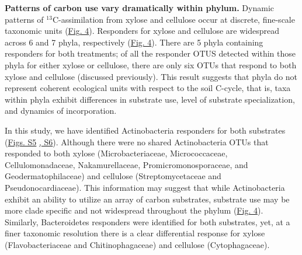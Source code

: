 \textbf{Patterns of carbon use vary dramatically within phylum.} Dynamic
patterns of $^{13}$C-assimilation from xylose and cellulose occur at discrete,
fine-scale taxonomic units
(\href{https://authorea.com/users/3537/articles/3612/master/file/figures/bacteria_tree/bacteria_tree.png}{Fig.
4}). Responders for xylose and cellulose are widespread across 6 and 7 phyla,
respectively
(\href{https://authorea.com/users/3537/articles/3612/master/file/figures/bacteria_tree/bacteria_tree.png}{Fig.
4}). There are 5 phyla containing responders for both treatments; of all the
responder OTUS detected within those phyla for either xylose or cellulose,
there are only six OTUs that respond to both xylose and cellulose (discussed
previously). This result suggests that phyla do not represent coherent
ecological units with respect to the soil C-cycle, that is, taxa within phyla
exhibit differences in substrate use, level of substrate specialization, and
dynamics of incorporation. 

In this study, we have identified Actinobacteria responders for both substrates
(\href{https://authorea.com/users/3537/articles/8459/master/file/figures/xylose_resp_profiles/xylose_resp_profiles.png}{Figs.
S5}
\href{https://authorea.com/users/3537/articles/8459/master/file/figures/cellulose_resp_profiles/cellulose_resp_profiles.png}{,
S6}). Although there were no shared Actinobacteria OTUs that responded to both
xylose (Microbacteriaceae, Micrococcaceae, Cellulomonadaceae, Nakamurellaceae,
Promicromonosporaceae, and Geodermatophilaceae) and cellulose
(Streptomycetaceae and Pseudonocardiaceae). This information may suggest that
while Actinobacteria exhibit an ability to utilize an array of carbon
substrates, substrate use may be more clade specific and not widespread
throughout the phylum
(\href{https://authorea.com/users/3537/articles/3612/master/file/figures/bacteria_tree/bacteria_tree.png}{Fig.
4}). Similarly, Bacteroidetes responders were identified for both substrates,
yet, at a finer taxonomic resolution there is a clear differential response for
xylose (Flavobacteriaceae and Chitinophagaceae) and cellulose (Cytophagaceae). 


